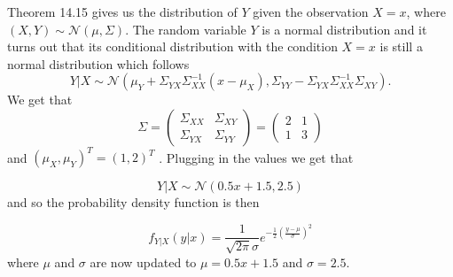 
Theorem 14.15 gives us the distribution of $ Y$ given the observation $ X = x$, where $ (X,Y) \sim
\mathcal N(\mu, \Sigma)$. The random variable $ Y$ is a normal distribution and it turns out that
its conditional distribution with the condition $ X = x$ is still a normal distribution which
follows
\[
    Y|X \sim \mathcal N(\mu_{Y} + \Sigma_{YX} \Sigma_{XX}^{-1}(x-\mu_{X} ), \Sigma_{YY} -\Sigma_{YX}
    \Sigma_{XX}^{-1} \Sigma_{XY} )
.\] 
We get that 
\[
    \Sigma = \begin{pmatrix}
	\Sigma_{XX} & \Sigma_{XY} \\
         \Sigma_{YX}& \Sigma_{YY} 
    \end{pmatrix} = \begin{pmatrix}
	2 & 1 \\
	1 & 3
    \end{pmatrix} 
\] 
and $ (\mu_{X}, \mu_{Y})^{T} = (1,2)^{T}  $ . Plugging in the values we get that 

\[
    Y|X \sim \mathcal N(0.5x + 1.5, 2.5)
\] 
and so the probability density function is then 

\[
    f_{Y|X} (y|x) = \frac{1}{\sqrt{2\pi} \sigma} e^{- \frac{1}{2} \left( \frac{y-\mu}{\sigma} \right)^2}  
\]  
where $ \mu$ and $ \sigma$ are now updated to $ \mu = 0.5x + 1.5$ and $ \sigma = 2.5$.
